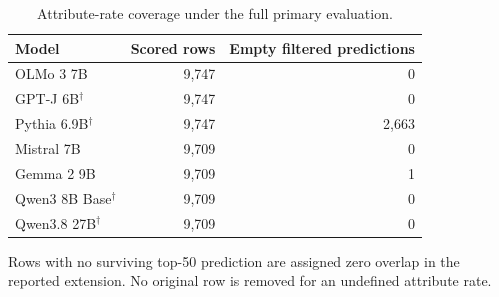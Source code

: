 \begin{table}[t]
\centering\small
\caption{Attribute-rate coverage under the full primary evaluation.}
\label{tab:attribute-coverage}
\begin{tabular}{@{}lrr@{}}
\toprule
Model & Scored rows & Empty filtered predictions \\
\midrule
OLMo 3 7B & 9,747 & 0 \\
GPT-J 6B$^{\dagger}$ & 9,747 & 0 \\
Pythia 6.9B$^{\dagger}$ & 9,747 & 2,663 \\
Mistral 7B & 9,709 & 0 \\
Gemma 2 9B & 9,709 & 1 \\
Qwen3 8B Base$^{\dagger}$ & 9,709 & 0 \\
Qwen3.8 27B$^{\dagger}$ & 9,709 & 0 \\
\bottomrule
\end{tabular}
\par\smallskip\begin{minipage}{\linewidth}\footnotesize Rows with no surviving top-50 prediction are assigned zero overlap in the reported extension. No original row is removed for an undefined attribute rate.\end{minipage}
\end{table}
